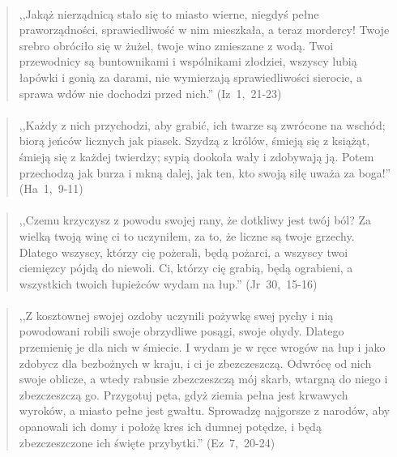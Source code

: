 \documentclass[10pt,a4paper,oneside]{article}
\begin{document}
\paragraph{}
\begin{quote}
,,Jakąż nierządnicą stało się to miasto wierne, niegdyś pełne praworządności, sprawiedliwość w nim mieszkała, a teraz mordercy! Twoje srebro obróciło się w żużel, twoje wino zmieszane z wodą. Twoi przewodnicy są buntownikami i wspólnikami złodziei, wszyscy lubią łapówki i gonią za darami, nie wymierzają sprawiedliwości sierocie, a sprawa wdów nie dochodzi przed nich.'' \mbox{(Iz 1, 21-23)}
\end{quote}
\paragraph{}
\begin{quote}
,,Każdy z nich przychodzi, aby grabić, ich twarze są zwrócone na wschód; biorą jeńców licznych jak piasek. Szydzą z królów, śmieją się z książąt, śmieją się z każdej twierdzy; sypią dookoła wały i zdobywają ją. Potem przechodzą jak burza i mkną dalej, jak ten, kto swoją siłę uważa za boga!'' \mbox{(Ha 1, 9-11)}
\end{quote}
\paragraph{}
\begin{quote}
,,Czemu krzyczysz z powodu swojej rany, że dotkliwy jest twój ból? Za wielką twoją winę ci to uczyniłem, za to, że liczne są twoje grzechy. Dlatego wszyscy, którzy cię pożerali, będą pożarci, a wszyscy twoi ciemięzcy pójdą do niewoli. Ci, którzy cię grabią, będą ograbieni, a wszystkich twoich łupieżców wydam na łup.'' \mbox{(Jr 30, 15-16)}
\end{quote}
\paragraph{}
\begin{quote}
,,Z kosztownej swojej ozdoby uczynili pożywkę swej pychy i nią powodowani robili swoje obrzydliwe posągi, swoje ohydy. Dlatego przemienię je dla nich w śmiecie. I wydam je w ręce wrogów na łup i jako zdobycz dla bezbożnych w kraju, i ci je zbezczeszczą. Odwrócę od nich swoje oblicze, a wtedy rabusie zbezczeszczą mój skarb, wtargną do niego i zbezczeszczą go. Przygotuj pęta, gdyż ziemia pełna jest krwawych wyroków, a miasto pełne jest gwałtu. Sprowadzę najgorsze z narodów, aby opanowali ich domy i położę kres ich dumnej potędze, i będą zbezczeszczone ich święte przybytki.'' \mbox{(Ez 7, 20-24)}
\end{quote}
\end{document}
